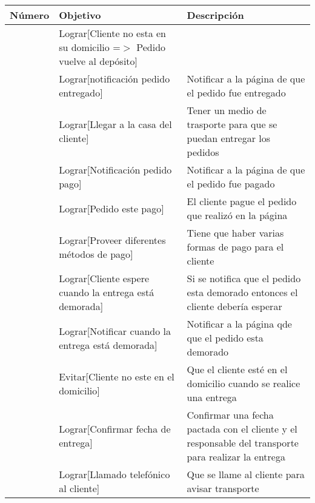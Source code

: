 \documentclass[a4paper]{article}
\begin{document}
\begin{table}[h]
\begin{tabular}{p{2cm} p{7cm} p{8cm}}
\rule{0pt}{1.2em} Número & Objetivo & Descripción\\[0.2em]
\hline

\rule{0pt}{1.2em} & Lograr[Cliente no esta en su domicilio =$>$ Pedido vuelve al depósito] & \\[0.2em]

\rule{0pt}{1.2em} & Lograr[notificación pedido entregado] & Notificar a la página de que el pedido fue entregado\\[0.2em]

\rule{0pt}{1.2em} & Lograr[Llegar a la casa del cliente] & Tener un medio de trasporte para que se puedan entregar los pedidos\\[0.2em]

\rule{0pt}{1.2em} & Lograr[Notificación pedido pago] & Notificar a la página de que el pedido fue pagado\\[0.2em]

\rule{0pt}{1.2em} & Lograr[Pedido este pago] & El cliente pague el pedido que realizó en la página\\[0.2em]

\rule{0pt}{1.2em} & Lograr[Proveer diferentes métodos de pago] & Tiene que haber varias formas de pago para el cliente\\[0.2em]

\rule{0pt}{1.2em} & Lograr[Cliente espere cuando la entrega está demorada] & Si se notifica que el pedido esta demorado entonces el cliente debería esperar\\[0.2em]

\rule{0pt}{1.2em} & Lograr[Notificar cuando la entrega está demorada] & Notificar a la página qde que el pedido esta demorado\\[0.2em]

\rule{0pt}{1.2em} & Evitar[Cliente no este en el domicilio] & Que el cliente esté en el domicilio cuando se realice una entrega\\[0.2em]

\rule{0pt}{1.2em} & Lograr[Confirmar fecha de entrega] & Confirmar una fecha pactada con el cliente y el responsable del transporte para realizar la entrega\\[0.2em]

\rule{0pt}{1.2em} & Lograr[Llamado telefónico al cliente] & Que se llame al cliente para avisar transporte\\[0.2em]


\end{tabular}
\end{table}
\end{document}
